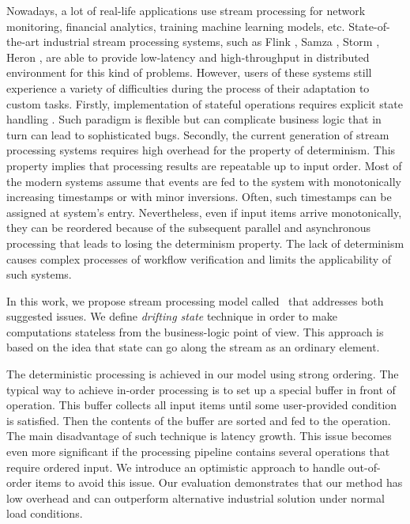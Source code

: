 
\label {fs-intro-seciton}

Nowadays, a lot of real-life applications use stream processing for network monitoring, financial analytics, training machine learning models, etc. State-of-the-art industrial stream processing systems, such as Flink \cite{carbone2015apache}, Samza \cite{Noghabi:2017:SSS:3137765.3137770}, Storm \cite{apache:storm}, Heron \cite{Kulkarni:2015:THS:2723372.2742788}, are able to provide low-latency and high-throughput in distributed environment for this kind of problems. However, users of these systems still experience a variety of difficulties during the process of their adaptation to custom tasks. Firstly, implementation of stateful operations requires explicit state handling \cite{apache:flink:state} \cite{apache:storm:state}. Such paradigm is flexible but can complicate business logic that in turn can lead to sophisticated bugs. Secondly, the current generation of stream processing systems requires high overhead for the property of determinism. This property implies that processing results are repeatable up to input order. Most of the modern systems assume that events are fed to the system with monotonically increasing timestamps or with minor inversions. Often, such timestamps can be assigned at system's entry. Nevertheless, even if input items arrive monotonically, they can be reordered because of the subsequent parallel and asynchronous processing that leads to losing the determinism property. The lack of determinism causes complex processes of workflow verification and limits the applicability of such systems.

In this work, we propose stream processing model called \FlameStream\ that addresses both suggested issues. We define {\it drifting state} technique in order to make computations stateless from the business-logic point of view. This approach is based on the idea that state can go along the stream as an ordinary element. 

The deterministic processing is achieved in our model using strong ordering. The typical way to achieve in-order processing is to set up a special buffer in front of operation. This buffer collects all input items until some user-provided condition is satisfied. Then the contents of the buffer are sorted and fed to the operation. The main disadvantage of such technique is latency growth. This issue becomes even more significant if the processing pipeline contains several operations that require ordered input. We introduce an optimistic approach to handle out-of-order items to avoid this issue. Our evaluation demonstrates that our method has low overhead and can outperform alternative industrial solution under normal load conditions.

